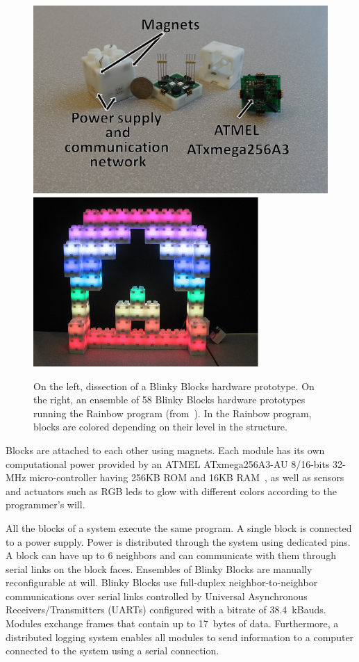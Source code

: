 \begin{figure}[!h]
	\centering
	\includegraphics[width=0.475\linewidth]{images/context/bb-details.png}
	\includegraphics[width=0.475\linewidth]{images/context/bb-rainbow.png}
	\caption{On the left, dissection of a Blinky Blocks hardware prototype. On the right, an ensemble of 58 Blinky Blocks hardware prototypes running the Rainbow program (from~\cite{Kirby-chi11}). In the Rainbow program, blocks are colored depending on their level in the structure.}
	\label{fig:context:blinkyblocks}
\end{figure}

Blocks are attached to each other using magnets. Each module has its own computational power provided by an ATMEL ATxmega256A3-AU 8/16-bits 32-MHz micro-controller having 256KB ROM and 16KB RAM~\cite{xmegaA3datasheet}, as well as sensors and actuators such as RGB leds to glow with different colors according to the programmer's will.

All the blocks of a system execute the same program. A single block is connected to a power supply. Power is distributed through the system using dedicated pins. A block can have up to 6 neighbors and can communicate with them through serial links on the block faces. Ensembles of Blinky Blocks are manually reconfigurable at will. Blinky Blocks use full-duplex neighbor-to-neighbor communications over serial links controlled by Universal Asynchronous Receivers/Transmitters (UARTs) configured with a bitrate of 38.4~kBauds. Modules exchange frames that contain up to 17~bytes of data. Furthermore, a distributed logging system enables all modules to send information to a computer connected to the system using a serial connection.

